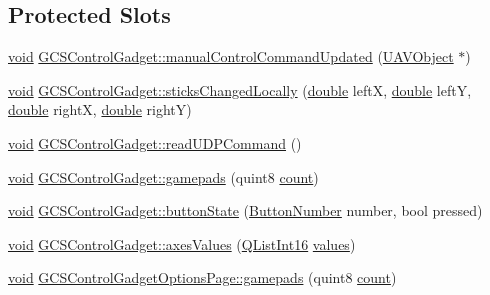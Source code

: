\subsection*{Protected Slots}
\begin{DoxyCompactItemize}
\item 
\hyperlink{group___u_a_v_objects_plugin_ga444cf2ff3f0ecbe028adce838d373f5c}{void} \hyperlink{group___g_c_s_control_gadget_plugin_gaac625204097cbd30812c0143a80ce3ea}{G\-C\-S\-Control\-Gadget\-::manual\-Control\-Command\-Updated} (\hyperlink{class_u_a_v_object}{U\-A\-V\-Object} $\ast$)
\item 
\hyperlink{group___u_a_v_objects_plugin_ga444cf2ff3f0ecbe028adce838d373f5c}{void} \hyperlink{group___g_c_s_control_gadget_plugin_gae9a31787be607e3bf9b8b6b6a3e47983}{G\-C\-S\-Control\-Gadget\-::sticks\-Changed\-Locally} (\hyperlink{_super_l_u_support_8h_a8956b2b9f49bf918deed98379d159ca7}{double} left\-X, \hyperlink{_super_l_u_support_8h_a8956b2b9f49bf918deed98379d159ca7}{double} left\-Y, \hyperlink{_super_l_u_support_8h_a8956b2b9f49bf918deed98379d159ca7}{double} right\-X, \hyperlink{_super_l_u_support_8h_a8956b2b9f49bf918deed98379d159ca7}{double} right\-Y)
\item 
\hyperlink{group___u_a_v_objects_plugin_ga444cf2ff3f0ecbe028adce838d373f5c}{void} \hyperlink{group___g_c_s_control_gadget_plugin_ga69fe9e7fd531e69ac57247eb50f59874}{G\-C\-S\-Control\-Gadget\-::read\-U\-D\-P\-Command} ()
\item 
\hyperlink{group___u_a_v_objects_plugin_ga444cf2ff3f0ecbe028adce838d373f5c}{void} \hyperlink{group___g_c_s_control_gadget_plugin_ga1cb6abc684939d2e560ae07ca3a72cda}{G\-C\-S\-Control\-Gadget\-::gamepads} (quint8 \hyperlink{glext_8h_a5b40aca7a9682963dd00a8f5aef0a901}{count})
\item 
\hyperlink{group___u_a_v_objects_plugin_ga444cf2ff3f0ecbe028adce838d373f5c}{void} \hyperlink{group___g_c_s_control_gadget_plugin_ga515dc70507cb41b37c46ed3fd9addc47}{G\-C\-S\-Control\-Gadget\-::button\-State} (\hyperlink{sdlgamepad_8h_a2054e2a6e47649b0ab9d043afda9133f}{Button\-Number} number, bool pressed)
\item 
\hyperlink{group___u_a_v_objects_plugin_ga444cf2ff3f0ecbe028adce838d373f5c}{void} \hyperlink{group___g_c_s_control_gadget_plugin_ga575f8651147d4a9a96a360d3ac4c600f}{G\-C\-S\-Control\-Gadget\-::axes\-Values} (\hyperlink{sdlgamepad_8h_a0cff90f48b1cb30ecb36bbfea594b50b}{Q\-List\-Int16} \hyperlink{glext_8h_a300a8ed5fb9490aa35713406ec0412df}{values})
\item 
\hyperlink{group___u_a_v_objects_plugin_ga444cf2ff3f0ecbe028adce838d373f5c}{void} \hyperlink{group___g_c_s_control_gadget_plugin_ga058f3b55102371451400fd4bea33b523}{G\-C\-S\-Control\-Gadget\-Options\-Page\-::gamepads} (quint8 \hyperlink{glext_8h_a5b40aca7a9682963dd00a8f5aef0a901}{count})

\end{DoxyCompactItemize}
